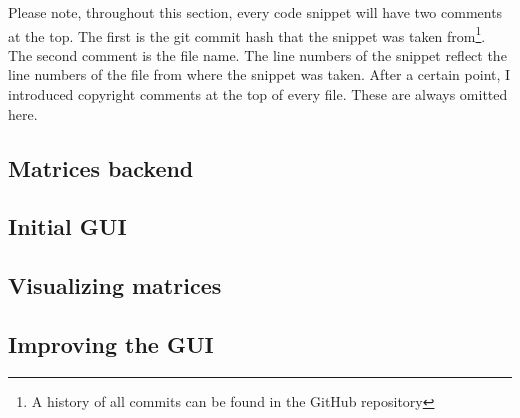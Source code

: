 \documentclass[../main.tex]{subfiles}
\begin{document}
Please note, throughout this section, every code snippet will have two comments at the top. The first is the git commit hash that the snippet was taken from\footnote{A history of all commits can be found in the GitHub repository\cite{lintrans-github}}. The second comment is the file name. The line numbers of the snippet reflect the line numbers of the file from where the snippet was taken. After a certain point, I introduced copyright comments at the top of every file. These are always omitted here.

\subsection{Matrices backend\label{development:matrices-backend}}


\subsection{Initial GUI\label{development:initial-gui}}


\subsection{Visualizing matrices\label{development:visualizing-matrices}}


\subsection{Improving the GUI\label{development:improving-the-gui}}

\end{document}
